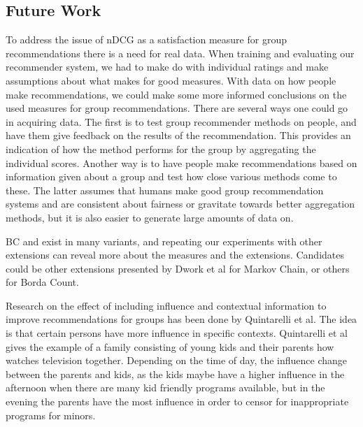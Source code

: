 \subsection{Future Work}\label{sec:futurework}

To address the issue of nDCG as a satisfaction measure for group recommendations there is a need for real data. When training and evaluating our recommender system, we had to make do with individual ratings and make assumptions about what makes for good measures. With data on how people make recommendations, we could make some more informed conclusions on the used measures for group recommendations. There are several ways one could go in acquiring data. The first is to test group recommender methods on people, and have them give feedback on the results of the recommendation. This provides an indication of how the method performs for the group by aggregating the individual scores. Another way is to have people make recommendations based on information given about a group and test how close various methods come to these. The latter assumes that humans make good group recommendation systems and are consistent about fairness or gravitate towards better aggregation methods, but it is also easier to generate large amounts of data on.

BC and \MC exist in many variants, and repeating our experiments with other extensions can reveal more about the measures and the extensions. Candidates could be other extensions presented by Dwork et al\cite{rank:aggregation} for Markov Chain, or others for Borda Count.


Research on the effect of including influence and contextual information to improve recommendations for groups has been done by Quintarelli et al\cite{Quintarelli2016}. The idea is that certain persons have more influence in specific contexts. Quintarelli et al gives the example of a family consisting of young kids and their parents how watches television together. Depending on the time of day, the influence change between the parents and kids, as the kids maybe have a higher influence in the afternoon when there are many kid friendly programs available, but in the evening the parents have the most influence in order to censor for inappropriate programs for minors. 

